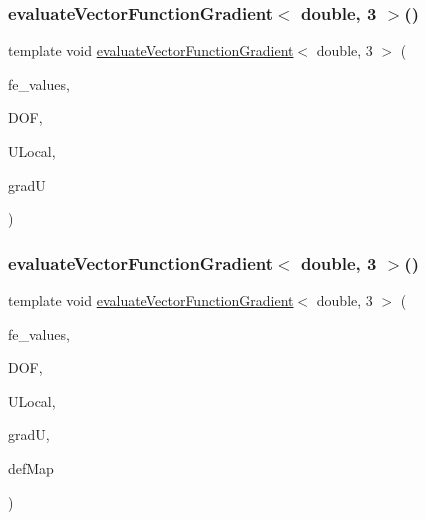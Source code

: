 \mbox{\label{function_evaluations_8cc_aae302a9653e837488a7c5989cff31c04}} 
\subsubsection{\texorpdfstring{evaluateVectorFunctionGradient$<$ double, 3 $>$()}{evaluateVectorFunctionGradient< double, 3 >()}\hspace{0.1cm}{\footnotesize\ttfamily [1/4]}}
{\footnotesize\ttfamily template void \mbox{\hyperlink{group___evaluation_functions_ga9608539d601a91aff1ba01ccc720fbe0}{evaluate\+Vector\+Function\+Gradient}}$<$ double, 3 $>$ (\begin{DoxyParamCaption}\item[{const F\+E\+Values$<$ 3 $>$ \&}]{fe\+\_\+values,  }\item[{unsigned int}]{D\+OF,  }\item[{Table$<$ 1, double $>$ \&}]{U\+Local,  }\item[{Table$<$ 3, double $>$ \&}]{gradU }\end{DoxyParamCaption})}

\mbox{\label{function_evaluations_8cc_a05515d4765602312924bf90d040f146e}} 
\subsubsection{\texorpdfstring{evaluateVectorFunctionGradient$<$ double, 3 $>$()}{evaluateVectorFunctionGradient< double, 3 >()}\hspace{0.1cm}{\footnotesize\ttfamily [2/4]}}
{\footnotesize\ttfamily template void \mbox{\hyperlink{group___evaluation_functions_ga9608539d601a91aff1ba01ccc720fbe0}{evaluate\+Vector\+Function\+Gradient}}$<$ double, 3 $>$ (\begin{DoxyParamCaption}\item[{const F\+E\+Values$<$ 3 $>$ \&}]{fe\+\_\+values,  }\item[{unsigned int}]{D\+OF,  }\item[{Table$<$ 1, double $>$ \&}]{U\+Local,  }\item[{Table$<$ 3, double $>$ \&}]{gradU,  }\item[{\mbox{\hyperlink{structdeformation_map}{deformation\+Map}}$<$ double, 3 $>$ \&}]{def\+Map }\end{DoxyParamCaption})}

